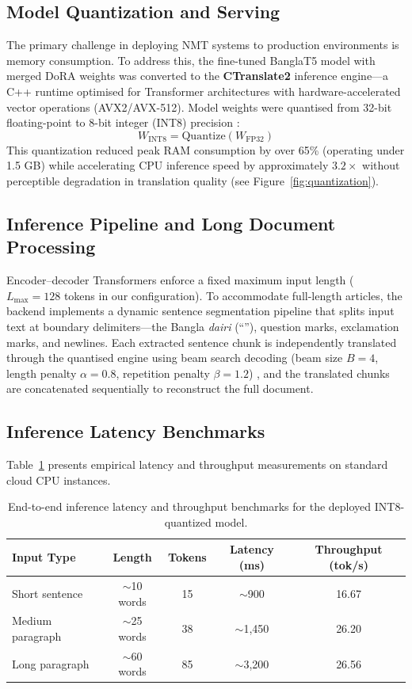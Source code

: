 \documentclass[12pt,a4paper]{article}
\begin{document}
\subsection{Model Quantization and Serving}
The primary challenge in deploying NMT systems to production environments is memory consumption. To address this, the fine-tuned BanglaT5 model with merged DoRA weights was converted to the \textbf{CTranslate2} \cite{klein-etal-2017-opennmt} inference engine---a C++ runtime optimised for Transformer architectures with hardware-accelerated vector operations (AVX2/AVX-512). Model weights were quantised from 32-bit floating-point to 8-bit integer (INT8) precision \cite{Jacob_2018_CVPR}:
\begin{equation}
W_{\text{INT8}} = \text{Quantize}(W_{\text{FP32}})
\end{equation}
This quantization reduced peak RAM consumption by over 65\% (operating under 1.5 GB) while accelerating CPU inference speed by approximately $3.2\times$ without perceptible degradation in translation quality (see Figure~\ref{fig:quantization}).

\subsection{Inference Pipeline and Long Document Processing}
Encoder--decoder Transformers enforce a fixed maximum input length ($L_{\max} = 128$ tokens in our configuration). To accommodate full-length articles, the backend implements a dynamic sentence segmentation pipeline that splits input text at boundary delimiters---the Bangla \textit{dairi} (``\textbar''), question marks, exclamation marks, and newlines. Each extracted sentence chunk is independently translated through the quantised engine using beam search decoding (beam size $B = 4$, length penalty $\alpha = 0.8$, repetition penalty $\beta = 1.2$) \cite{wu2016google}, and the translated chunks are concatenated sequentially to reconstruct the full document.

\subsection{Inference Latency Benchmarks}
Table~\ref{tab:latency} presents empirical latency and throughput measurements on standard cloud CPU instances.

\begin{table}[htbp]
\centering
\caption{End-to-end inference latency and throughput benchmarks for the deployed INT8-quantized model.}
\label{tab:latency}
\small
\begin{tabular}{l c c c c}
\toprule
\textbf{Input Type} & \textbf{Length} & \textbf{Tokens} & \textbf{Latency (ms)} & \textbf{Throughput (tok/s)} \\
\midrule
Short sentence & $\sim$10 words & 15 & $\sim$900 & 16.67 \\
Medium paragraph & $\sim$25 words & 38 & $\sim$1,450 & 26.20 \\
Long paragraph & $\sim$60 words & 85 & $\sim$3,200 & 26.56 \\
\bottomrule
\end{tabular}
\end{table}
\end{document}
